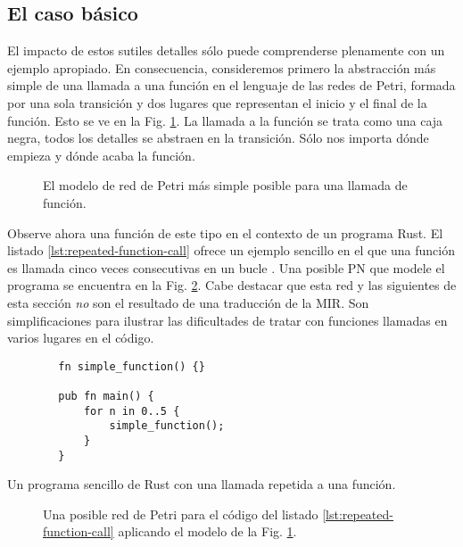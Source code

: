 \subsection{El caso básico}

El impacto de estos sutiles detalles sólo puede comprenderse plenamente con un ejemplo
apropiado. En consecuencia, consideremos primero la abstracción más simple de una llamada a una
función en el lenguaje de las redes de Petri, formada por una sola transición y dos lugares que
representan el inicio y el final de la función.
Esto se ve en la Fig. \ref{fig:simplest-function}.
La llamada a la función se trata como una caja negra, todos los
detalles se abstraen en la transición. Sólo nos importa dónde empieza y dónde acaba la
función.

\begin{figure}[!htb]
    \centering
    
    \caption{El modelo de red de Petri más simple posible para una llamada de función.}
    \label{fig:simplest-function}
\end{figure}

Observe ahora una función de este tipo en el contexto de un programa Rust.
El listado \ref{lst:repeated-function-call} ofrece un ejemplo sencillo
en el que una función es llamada cinco veces consecutivas en un bucle .
Una posible \acrshort{PN} que modele el programa se encuentra en la Fig. \ref{fig:repeated-function-call}.
Cabe destacar que esta red y las siguientes de esta sección \emph{no} son el resultado de una traducción de la MIR.
Son simplificaciones para ilustrar las dificultades de tratar con funciones llamadas en varios
lugares en el código.

\begin{listing}[!htb]
    \begin{verbatim}
        fn simple_function() {}

        pub fn main() {
            for n in 0..5 {
                simple_function();
            }
        }
    \end{verbatim}
    \caption{Un programa sencillo de Rust con una llamada repetida a una función.}
    \label{lst:repeated-function-call}
\end{listing}

\begin{figure}[!htb]
    \centering
    
    \caption{Una posible red de Petri para el código del listado \ref{lst:repeated-function-call}
        aplicando el modelo de la Fig. \ref{fig:simplest-function}.}
    \label{fig:repeated-function-call}
\end{figure}

